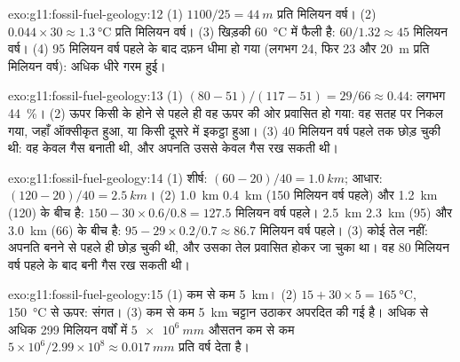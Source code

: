 \begin{solution}{exo:g11:fossil-fuel-geology:12}
(1) $1100/25 = \qty{44}{m}$ प्रति मिलियन वर्ष। (2) $0.044 \times 30
\approx \qty{1.3}{\degreeCelsius}$ प्रति मिलियन वर्ष। (3) खिड़की
\qty{60}{\degreeCelsius} में फैली है: $60/1.32 \approx 45$ मिलियन वर्ष। (4) 95 मिलियन वर्ष
पहले के बाद दफ़न धीमा हो गया (लगभग 24, फिर 23 और
\qty{20}{m} प्रति मिलियन वर्ष):  अधिक धीरे गरम हुई।
\end{solution}

\begin{solution}{exo:g11:fossil-fuel-geology:13}
(1) $(80 - 51)/(117 - 51) = 29/66 \approx 0.44$: लगभग \qty{44}{\percent}।
(2) ऊपर किसी  के होने से पहले ही वह ऊपर की ओर प्रवासित हो गया: वह
सतह पर निकल गया, जहाँ ऑक्सीकृत हुआ, या किसी दूसरे  में इकट्ठा हुआ। (3) 40
मिलियन वर्ष पहले तक   छोड़ चुकी थी: वह केवल गैस बनाती थी,
और अपनति उससे केवल गैस रख सकती थी।
\end{solution}

\begin{solution}{exo:g11:fossil-fuel-geology:14}
(1) शीर्ष: $(60 - 20)/40 = \qty{1.0}{km}$; आधार: $(120 - 20)/40 =
\qty{2.5}{km}$। (2) \qty{1.0}{km} \qty{0.4}{km} (150 मिलियन
वर्ष पहले) और \qty{1.2}{km} (120) के बीच है: $150 - 30 \times 0.6/0.8 = 127.5$
मिलियन वर्ष पहले। \qty{2.5}{km} \qty{2.3}{km} (95) और
\qty{3.0}{km} (66) के बीच है: $95 - 29 \times 0.2/0.7 \approx 86.7$ मिलियन वर्ष
पहले। (3) कोई तेल नहीं:  अपनति बनने से पहले ही  छोड़ चुकी थी,
और उसका तेल प्रवासित होकर जा चुका था। वह 80 मिलियन
वर्ष पहले के बाद बनी गैस रख सकती थी।
\end{solution}

\begin{solution}{exo:g11:fossil-fuel-geology:15}
(1) कम से कम \qty{5}{km}। (2) $15 + 30 \times 5 = \qty{165}{\degreeCelsius}$,
\qty{150}{\degreeCelsius} से ऊपर: संगत। (3) कम से कम \qty{5}{km}
चट्टान उठाकर अपरदित की गई है। अधिक से अधिक \num{299} मिलियन वर्षों में
$\qty{5e6}{mm}$ औसतन कम से कम $5 \times 10^6/2.99 \times 10^8
\approx \qty{0.017}{mm}$ प्रति वर्ष देता है।
\end{solution}


